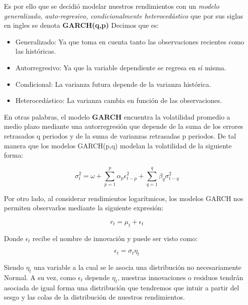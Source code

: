 \newpage

Es por ello que se decidió modelar nuestros rendimientos con un \textit{modelo generalizado, auto-regresivo, condicionalmente heterocedástico} que por sus siglas en ingles se denota
\textbf{GARCH(q,p)}
\newline Decimos que es: 

\begin{itemize}
\item Generalizado: Ya que toma en cuenta tanto las observaciones recientes como las históricas.
\item  Autorregresivo: Ya que la variable dependiente se regresa en sí misma.
\item  Condicional: La varianza futura depende de la varianza histórica.
\item Heterocedástico: La varianza cambia en función de las observaciones.
\end{itemize}






En otras palabras, el modelo \textbf{GARCH} encuentra la volatilidad promedio a medio plazo mediante una autorregresión que depende de la suma de los errores retrasados q periodos y de la suma de varianzas retrasadas p periodos. De tal manera que los modelos GARCH(p,q) modelan la volatilidad de la siguiente forma:

\begin{equation}
   \sigma_t^2 =\omega+   \sum^p_{p=1}\alpha_p \epsilon_{t-p}^2 +  \sum^q_{q=1}\beta_q \sigma_{t-q}^2
\end{equation}

Por otro lado, al considerar rendimientos logarítmicos, los modelos GARCH nos permiten observarlos mediante la siguiente expresión:

\begin{equation}
   r_t =\mu_t +  \epsilon_t 
\end{equation}

Donde $\epsilon_t  $ recibe el nombre de innovación y puede ser visto como: 

\begin{equation}
   \epsilon_t =\sigma_t\eta_t 
\end{equation}

Siendo $\eta_t  $ una variable a la cual se le asocia una distribución no necesariamente Normal.
A su vez, como $\epsilon_t$ depende 
$\eta_t$, nuestras innovaciones o residuos tendrán asociada de igual forma una distribución que tendremos que intuir a partir del sesgo y las colas de la distribución de nuestros rendimientos.
\bigskip

